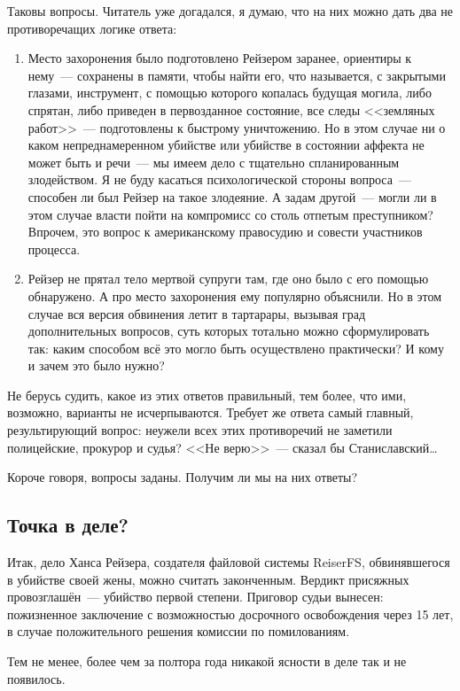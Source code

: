 Таковы вопросы. Читатель уже догадался, я думаю, что на них можно дать два не противоречащих логике ответа: 


\begin{enumerate}
	\item Место захоронения было подготовлено Рейзером заранее, ориентиры к нему~--- сохранены в памяти, чтобы найти его, что называется, с закрытыми глазами, инструмент, с помощью которого копалась будущая могила, либо спрятан, либо приведен в первозданное состояние, все следы <<земляных работ>>~--- подготовлены к быстрому уничтожению. Но в этом случае ни о каком непреднамеренном убийстве или убийстве в состоянии аффекта не может быть и речи~--- мы имеем дело с тщательно спланированным злодейством. Я не буду касаться психологической стороны вопроса~--- способен ли был Рейзер на такое злодеяние. А задам другой~--- могли ли в этом случае власти пойти на компромисс со столь отпетым преступником? Впрочем, это вопрос к американскому правосудию и совести участников процесса. 
	\item Рейзер не прятал тело мертвой супруги там, где оно было с его помощью обнаружено. А про место захоронения ему популярно объяснили. Но в этом случае вся версия обвинения летит в тартарары, вызывая град дополнительных вопросов, суть которых тотально можно сформулировать так: каким способом всё это могло быть осуществлено практически? И кому и зачем это было нужно? 
\end{enumerate}

Не берусь судить, какое из этих ответов правильный, тем более, что ими, возможно, варианты не исчерпываются. Требует же ответа самый главный, результирующий вопрос: неужели всех этих противоречий не заметили полицейские, прокурор и судья? <<Не верю>>~--- сказал бы Станиславский\dots 

Короче говоря, вопросы заданы. Получим ли мы на них ответы? 

\subsection{Точка в деле?}

Итак, дело Ханса Рейзера, создателя файловой системы ReiserFS, обвинявшегося в убийстве своей жены, можно считать законченным. Вердикт присяжных провозглашён~--- убийство первой степени. Приговор судьи вынесен: пожизненное заключение с возможностью досрочного освобождения через 15 лет, в случае положительного решения комиссии по помилованиям.

Тем не менее, более чем за полтора года никакой ясности в деле так и не появилось.

